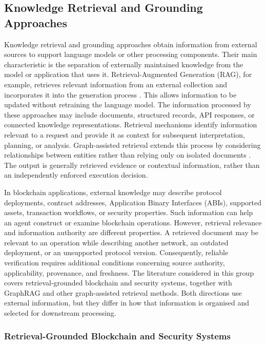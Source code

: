 \subsection{Knowledge Retrieval and Grounding Approaches}
\label{subsec:knowledge_retrieval_grounding}

Knowledge retrieval and grounding approaches obtain information
from external sources to support language models or other
processing components. Their main characteristic is the
separation of externally maintained knowledge from the
model or application that uses it. Retrieval-Augmented
Generation (RAG), for example, retrieves relevant information
from an external collection and incorporates it into the
generation process \cite{lewisRetrievalAugmentedGeneration2020}.
This allows information to be updated without retraining the
language model. The information processed by these approaches may include
documents, structured records, API responses, or connected
knowledge representations. Retrieval mechanisms identify
information relevant to a request and provide it as context
for subsequent interpretation, planning, or analysis.
Graph-assisted retrieval extends this process by considering
relationships between entities rather than relying only
on isolated documents
\cite{hanRetrievalAugmentedGenerationGraphs2025}.
The output is generally retrieved evidence or contextual
information, rather than an independently enforced
execution decision.

In blockchain applications, external knowledge may describe
protocol deployments, contract addresses, Application Binary
Interfaces (ABIs), supported assets, transaction workflows,
or security properties. Such information can help an agent
construct or examine blockchain operations. However,
retrieval relevance and information authority are different
properties. A retrieved document may be relevant to an
operation while describing another network, an outdated
deployment, or an unsupported protocol version.
Consequently, reliable verification requires additional
conditions concerning source authority, applicability,
provenance, and freshness. The literature considered in this group covers
retrieval-grounded blockchain and security systems,
together with GraphRAG and other graph-assisted retrieval
methods. Both directions use external information, but
they differ in how that information is organised and
selected for downstream processing.

\subsubsection{Retrieval-Grounded Blockchain and Security Systems}

